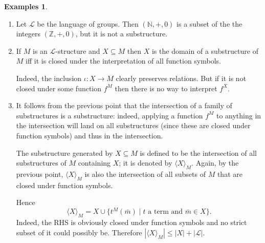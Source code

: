 \documentclass{report}
\theoremstyle{definition}
\theoremstyle{plain}
\theoremstyle{definition}
\newtheorem{egs}[thm]{Examples}
\begin{document}
	\begin{egs}\leavevmode
		\begin{enumerate}
			\item Let $\mathcal{L}$ be the language of groups. Then $(\mathbb{N},+,0)$ is a subset of the the integers $(\mathbb{Z},+,0)$, but it is not a substructure.
			\item If $M$ is an $\mathcal{L}$-structure and $X\subseteq M$ then $X$ is the domain of a substructure of $M$ iff it is closed under the interpretation of all function symbols.
			
			Indeed, the inclusion $\iota\colon X \to M$ clearly preserves relations. But if it is not closed under some function $f^M$ then there is no way to interpret $f^X$. 
			\item It follows from the previous point that the intersection of a family of substructures is a substructure: indeed, applying a function $f^M$ to anything in the intersection will land on all substructures (since these are closed under function symbols) and thus in the intersection.
			
			The substructure generated by $X\subseteq M$ is defined to be the intersection of all substructures of $M$ containing $X$; it is denoted by $\langle X\rangle_{M}$. Again, by the previous point, $\langle X\rangle_M$ is also the intersection of all subsets of $M$ that are closed under function symbols.
			
			Hence
			\[
				\langle X\rangle_{M} = X \cup \{t^M(\bar{m})\mid t\text{ a term and }\bar{m}\in X\}.
			\]
			Indeed, the RHS is obviously closed under function symbols and no strict subset of it could possibly be. Therefore $|\langle X \rangle_{M}| \leq |X| + |\mathcal{L}|$.
		\end{enumerate}
	\end{egs}
\end{document}
